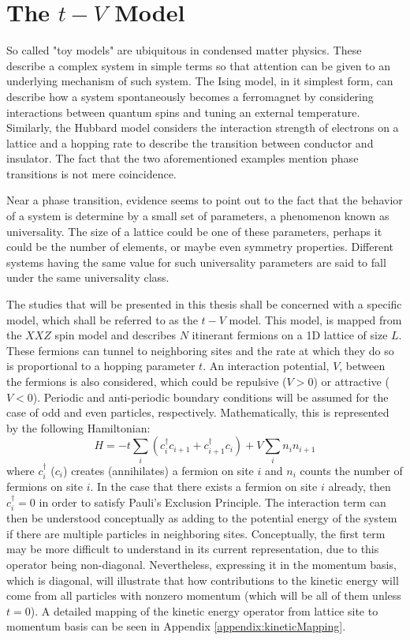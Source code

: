 \section{The $t-V$ Model}
\label{sec:t-VIntro}

So called "toy models" are ubiquitous in condensed matter physics. These describe a complex system in simple terms so that attention can be given to an underlying mechanism of such system. The Ising model, in it simplest form, can describe how a system spontaneously becomes a ferromagnet by considering interactions between quantum spins and tuning an external temperature. Similarly, the Hubbard model considers the interaction strength of electrons on a lattice and a hopping rate to describe the transition between conductor and insulator. The fact that the two aforementioned examples mention phase transitions is not mere coincidence. 

Near a phase transition, evidence seems to point out to the fact that the behavior of a system is determine by a small set of parameters, a phenomenon known as universality. The size of a lattice could be one of these parameters, perhaps it could be the number of elements, or maybe even symmetry properties. Different systems having the same value for such universality parameters are said to fall under the same universality class. 

The studies that will be presented in this thesis shall be concerned with a specific model, which shall be referred to as the $t-V$ model. This model, is mapped from the $XXZ$ spin model and describes $N$ itinerant fermions on a 1D lattice of size $L$. These fermions can tunnel to neighboring sites and the rate at which they do so is proportional to a hopping parameter $t$. An interaction potential, $V$, between the fermions is also considered, which could be repulsive ($V > 0$) or attractive ($V < 0$). Periodic and anti-periodic boundary conditions will be assumed for the case of odd and even particles, respectively. Mathematically, this is represented by the following Hamiltonian:
%
\begin{equation}
H = -t \sum_{i} \left ( c_{i}^{\dag} c_{i+1} + c_{i+1}^{\dag} c_{i} \right )+ V \sum_{i} n_i n_{i+1}   
\label{eq:t-VHamiltonian}
\end{equation}
%
where $c_{i}^{\dag}$ ($c_{i}$) creates (annihilates) a fermion on site $i$ and $n_{i}$ counts the number of fermions on site $i$. In the case that there exists a fermion on site $i$ already, then $c_{i}^{\dag} = 0$ in order to satisfy Pauli's Exclusion Principle. The interaction term can then be understood conceptually as adding to the potential energy of the system if there are multiple particles in neighboring sites. Conceptually, the first term may be more difficult to understand in its current representation, due to this operator being non-diagonal. Nevertheless, expressing it in the momentum basis, which is diagonal, will illustrate that how contributions to the kinetic energy will come from all particles with nonzero momentum (which will be all of them unless $t=0$). A detailed mapping of the kinetic energy operator from lattice site to momentum basis can be seen in Appendix \ref{appendix:kineticMapping}.

